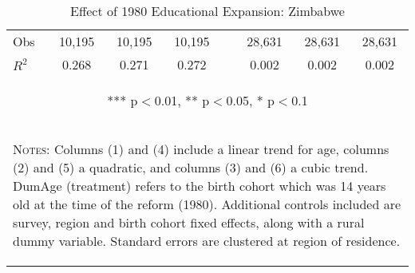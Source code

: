 \begin{subtables}
\begin{landscape}
\begin{table}[htpb!]
\begin{center}
\begin{tabular}{lcccp{0.3cm}ccc}
Obs	&	10,195	&	10,195	&	10,195	&&	28,631	&	28,631	&	28,631	\\	
$R^2$	&	0.268	&	0.271	&	0.272	&&	0.002	&	0.002	&	0.002	\\ \midrule	
\multicolumn{8}{c}{\begin{footnotesize} *** p$<$0.01, ** p$<$0.05, * p$<$0.1\end{footnotesize}} \\														
\multicolumn{8}{p{16cm}}{\begin{footnotesize}\textsc{Notes:} Columns (1) and (4) include a linear trend for age, columns (2) and (5) a quadratic, and columns (3) and (6) a cubic trend.  DumAge (treatment) refers to the birth cohort which was 14 years old at the time of the reform (1980).  Additional controls included are survey, region and birth cohort fixed effects, along with a rural dummy variable. Standard errors are clustered at region of residence. \end{footnotesize}}\\														
\bottomrule														
\end{tabular}														
\caption{Effect of 1980 Educational Expansion: Zimbabwe}														
\vspace{-6mm}														
\label{tab:Zimbabwe}														
\end{center}														
\end{table}														
\end{landscape}														


\end{subtables}
